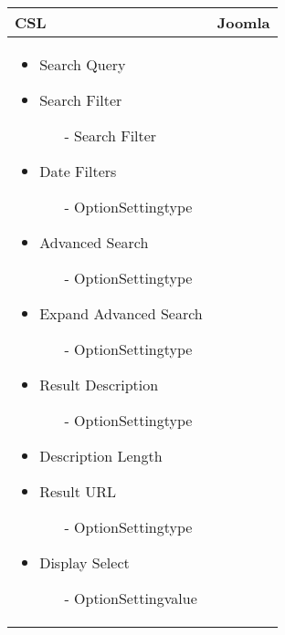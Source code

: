 \begin{minipage}{0.7\textwidth}
\begin{tabular}{|p{} | p{}|}
\hline
\textbf{CSL} & \textbf{Joomla} \\ 
\hline
\begin{itemize}
\item Search Query
\item Search Filter
 \begin{enumerate}
 \item[-]  Search Filter
 \end{enumerate}
\item Date Filters
\begin{enumerate}
 	\item[-] OptionSettingtype
 \end{enumerate} 
\item Advanced Search
\begin{enumerate}
 	\item[-] OptionSettingtype
 \end{enumerate} 
\item Expand Advanced Search
\begin{enumerate}
 	\item[-] OptionSettingtype
 \end{enumerate} 
\item Result Description
\begin{enumerate}
 	\item[-] OptionSettingtype
 \end{enumerate} 
\item Description Length 
\item Result URL
\begin{enumerate}
 	\item[-] OptionSettingtype
 \end{enumerate}
\item Display Select
\begin{enumerate}
 	\item[-] OptionSettingvalue
 \end{enumerate} 
\end{itemize}


\end{tabular}
\end{minipage}
